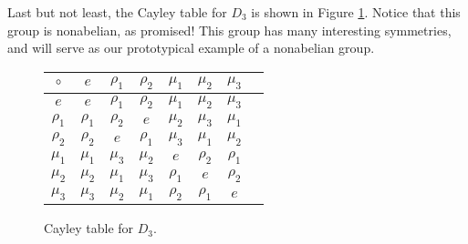 Last but not least, the Cayley table for $D_3$ is shown in Figure \ref{cayleyD3}. Notice that this group is nonabelian, as promised! This group has many interesting symmetries, and will serve as our prototypical example of a nonabelian group.

\begin{figure}[ht]
\centering
\begin{tabular}{c | c c c c c c c}
    $\circ$  & $e$      & $\rho_1$ & $\rho_2$ & $\mu_1$  & $\mu_2$  & $\mu_3$ \\
    \hline
    $e$      & $e$      & $\rho_1$ & $\rho_2$ & $\mu_1$  & $\mu_2$  & $\mu_3$ \\
    $\rho_1$ & $\rho_1$ & $\rho_2$ & $e$      & $\mu_2$  & $\mu_3$  & $\mu_1$ \\
    $\rho_2$ & $\rho_2$ & $e$      & $\rho_1$ & $\mu_3$  & $\mu_1$  & $\mu_2$ \\
    $\mu_1$  & $\mu_1$  & $\mu_3$  & $\mu_2$  & $e$      & $\rho_2$ & $\rho_1$\\
    $\mu_2$  & $\mu_2$  & $\mu_1$  & $\mu_3$  & $\rho_1$ & $e$      & $\rho_2$\\
    $\mu_3$  & $\mu_3$  & $\mu_2$  & $\mu_1$  & $\rho_2$ & $\rho_1$ & $e$     \\
\end{tabular}
\caption{Cayley table for $D_3$.}
\label{cayleyD3}
\end{figure}
